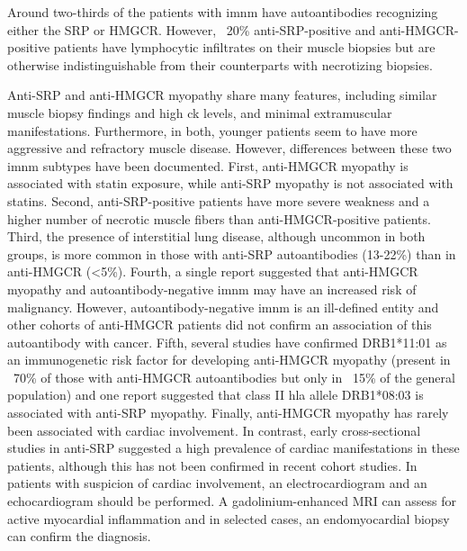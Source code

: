 Around two-thirds of the patients with \gls{imnm} have autoantibodies recognizing either the SRP or HMGCR. However, ~20\% anti-SRP-positive and anti-HMGCR-positive patients have lymphocytic infiltrates on their muscle biopsies but are otherwise indistinguishable from their counterparts with necrotizing biopsies.\cite{Suzuki2015,Mammen2011,Allenbach2018}

Anti-SRP and anti-HMGCR myopathy share many features, including similar muscle biopsy findings and high \gls{ck} levels, and minimal extramuscular manifestations.\cite{Watanabe2016} Furthermore, in both, younger patients seem to have more aggressive and refractory muscle disease.\cite{PinalFernandez2017b,Tiniakou2017} However, differences between these two \gls{imnm} subtypes have been documented. First, anti-HMGCR myopathy is associated with statin exposure,\cite{ChristopherStine2010} while anti-SRP myopathy is not associated with statins.\cite{PinalFernandez2017b,Suzuki2015} Second, anti-SRP-positive patients have more severe weakness and a higher number of necrotic muscle fibers than anti-HMGCR-positive patients.\cite{PinalFernandez2017b,Watanabe2016,Allenbach2018} Third, the presence of interstitial lung disease, although uncommon in both groups, is more common in those with anti-SRP autoantibodies (13-22\%) than in anti-HMGCR (<5\%).\cite{PinalFernandez2017b,Suzuki2015,Watanabe2016,Tiniakou2017} Fourth, a single report suggested that anti-HMGCR myopathy and autoantibody-negative \gls{imnm} may have an increased risk of malignancy.\cite{Allenbach2016} However, autoantibody-negative \gls{imnm} is an ill-defined entity and other cohorts of anti-HMGCR patients did not confirm an association of this autoantibody with cancer.\cite{Tiniakou2017,Watanabe2016} Fifth, several studies have confirmed DRB1*11:01 as an immunogenetic risk factor for developing anti-HMGCR myopathy (present in ~70\% of those with anti-HMGCR autoantibodies but only in ~15\% of the general population) and one report suggested that class II \gls{hla} allele DRB1*08:03 is associated with anti-SRP myopathy.\cite{Ohnuki2016,Mammen2012,Limaye2015} Finally, anti-HMGCR myopathy has rarely been associated with cardiac involvement.\cite{Watanabe2016} In contrast, early cross-sectional studies in anti-SRP suggested a high prevalence of cardiac manifestations in these patients,\cite{Targoff1990,Kao2004} although this has not been confirmed in recent cohort studies.\cite{PinalFernandez2017b,Suzuki2015,Watanabe2016} In patients with suspicion of cardiac involvement, an electrocardiogram and an echocardiogram should be performed. A gadolinium-enhanced MRI can assess for active myocardial inflammation and in selected cases, an endomyocardial biopsy can confirm the diagnosis.\cite{Chen2018}

